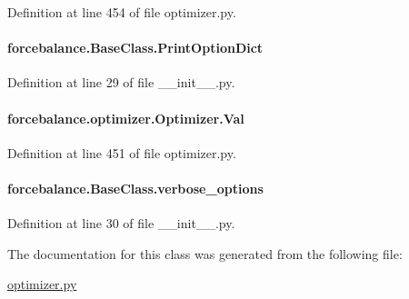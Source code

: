 Definition at line 454 of file optimizer.\-py.

\hypertarget{classforcebalance_1_1BaseClass_afc6659278497d7245bc492ecf405ccae}{
\paragraph[{Print\-Option\-Dict}]{\setlength{\rightskip}{0pt plus 5cm}forcebalance.\-Base\-Class.\-Print\-Option\-Dict\hspace{0.3cm}{\ttfamily [inherited]}}}\label{classforcebalance_1_1BaseClass_afc6659278497d7245bc492ecf405ccae}


Definition at line 29 of file \-\_\-\-\_\-init\-\_\-\-\_\-.\-py.

\hypertarget{classforcebalance_1_1optimizer_1_1Optimizer_a2577b97a9ee5f3fcd4aa108a2baafc04}{
\paragraph[{Val}]{\setlength{\rightskip}{0pt plus 5cm}forcebalance.\-optimizer.\-Optimizer.\-Val}}\label{classforcebalance_1_1optimizer_1_1Optimizer_a2577b97a9ee5f3fcd4aa108a2baafc04}


Definition at line 451 of file optimizer.\-py.

\hypertarget{classforcebalance_1_1BaseClass_afd68efa29ccd2f320f4cf82198214aac}{
\paragraph[{verbose\-\_\-options}]{\setlength{\rightskip}{0pt plus 5cm}forcebalance.\-Base\-Class.\-verbose\-\_\-options\hspace{0.3cm}{\ttfamily [inherited]}}}\label{classforcebalance_1_1BaseClass_afd68efa29ccd2f320f4cf82198214aac}


Definition at line 30 of file \-\_\-\-\_\-init\-\_\-\-\_\-.\-py.



The documentation for this class was generated from the following file\-:\begin{DoxyCompactItemize}
\item 
\hyperlink{optimizer_8py}{optimizer.\-py}\end{DoxyCompactItemize}
